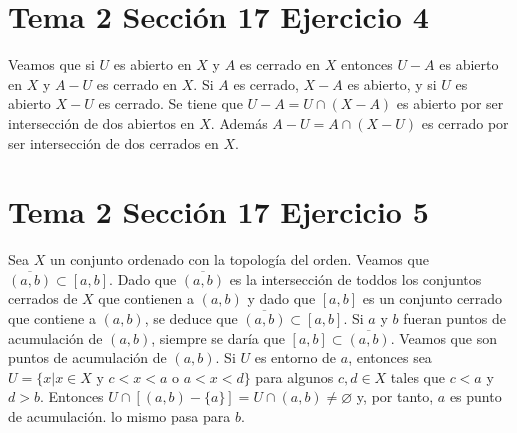 \documentclass{article}
\begin{document}
\section{Tema 2 Sección 17 Ejercicio 4}

Veamos que si $U$ es abierto en $X$ y $A$ es cerrado en $X$ entonces $U-A$ es abierto en $X$ y $A-U$ es cerrado en $X$. Si $A$ es cerrado, $X-A$ es abierto, y si $U$ es abierto $X-U$ es cerrado. Se tiene que $U-A=U\cap (X-A)$ es abierto por ser intersección de dos abiertos en $X$. Además $A-U=A\cap(X-U)$ es cerrado por ser intersección de dos cerrados en $X$.
\section{Tema 2 Sección 17 Ejercicio 5}

Sea $X$ un conjunto ordenado con la topología del orden. Veamos que $\overline{(a,b)}\subset[a,b]$. Dado que $\overline{(a,b)}$ es la intersección de toddos los conjuntos cerrados de $X$ que contienen a $(a,b)$ y dado que $[a,b]$ es un conjunto cerrado que contiene a $(a,b)$, se deduce que $\overline{(a,b)}\subset[a,b]$. Si $a$ y $b$ fueran puntos de acumulación de $(a,b)$, siempre se daría que $[a,b]\subset \overline{(a,b)}$. Veamos que son puntos de acumulación de $(a,b)$. Si $U$ es entorno de $a$, entonces sea $U=\{x|x\in X \text{ y } c<x<a \text{ o } a<x<d\}$ para algunos $c,d\in X$ tales que $c<a$ y $d>b$. Entonces $U\cap[ (a,b)-\{a\}]=U\cap (a,b)\neq \varnothing$ y, por tanto, $a$ es punto de acumulación. lo mismo pasa para $b$. 
\end{document}
